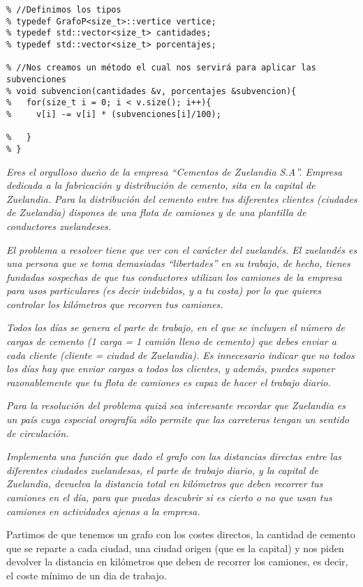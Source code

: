 \begin{verbatim}
% //Definimos los tipos
% typedef GrafoP<size_t>::vertice vertice;
% typedef std::vector<size_t> cantidades;
% typedef std::vector<size_t> porcentajes;

% //Nos creamos un método el cual nos servirá para aplicar las subvenciones
% void subvencion(cantidades &v, porcentajes &subvencion){
%   for(size_t i = 0; i < v.size(); i++){
%     v[i] -= v[i] * (subvenciones[i]/100);

%   }
% }

\end{verbatim}

\textbf{\large{}}\textit{ Eres el orgulloso dueño de la empresa “Cementos de Zuelandia S.A”. Empresa dedicada a la fabricación y distribución de cemento, sita en la capital de Zuelandia. Para la distribución del cemento entre tus diferentes clientes (ciudades de Zuelandia) dispones de una flota de camiones y de una plantilla de conductores zuelandeses.}

\textit{El problema a resolver tiene que ver con el carácter del zuelandés. El zuelandés es una persona que se toma demasiadas “libertades” en su trabajo, de hecho, tienes fundadas sospechas de que tus conductores utilizan los camiones de la empresa para usos particulares (es decir indebidos, y a tu costa) por lo que quieres controlar los kilómetros que recorren tus camiones.}

\textit{Todos los días se genera el parte de trabajo, en el que se incluyen el número de cargas de cemento (1 carga = 1 camión lleno de cemento) que debes enviar a cada cliente (cliente = ciudad de Zuelandia). Es innecesario indicar que no todos los días hay que enviar cargas a todos los clientes, y además, puedes suponer razonablemente que tu flota de camiones es capaz de hacer el trabajo diario.}

\textit{Para la resolución del problema quizá sea interesante recordar que Zuelandia es un país cuya especial orografía sólo permite que las carreteras tengan un sentido de circulación.}

\textit{Implementa una función que dado el grafo con las distancias directas entre las diferentes ciudades zuelandesas, el parte de trabajo diario, y la capital de Zuelandia, devuelva la distancia total en kilómetros que deben recorrer tus camiones en el día, para que puedas descubrir si es cierto o no que usan tus camiones en actividades ajenas a la empresa.}

Partimos de que tenemos un grafo con los costes directos, la cantidad de cemento que se reparte a cada ciudad, una ciudad origen (que es la capital) y nos piden devolver la distancia en kilómetros que deben de recorrer los camiones, es decir, el coste mínimo de un dia de trabajo.

